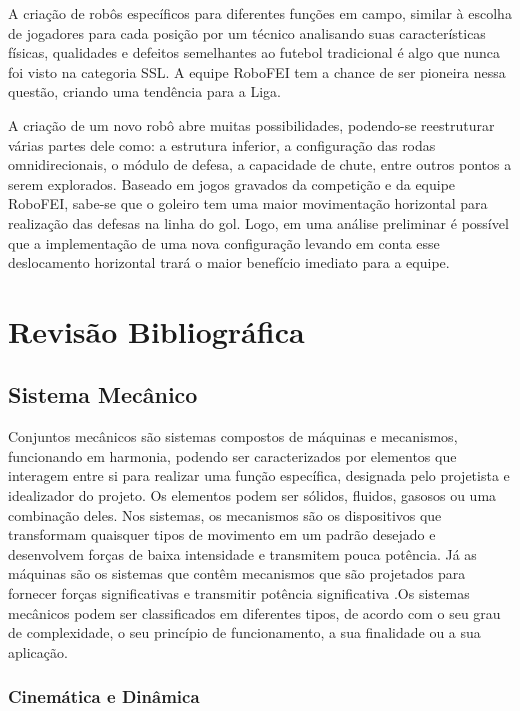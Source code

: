 \documentclass[deposito, acronym, symbols]{fei}
\begin{document}
A criação de robôs específicos para diferentes funções em campo, similar à escolha de jogadores para cada posição por um técnico analisando suas características físicas, qualidades e defeitos semelhantes ao futebol tradicional é algo que nunca foi visto na categoria SSL. A equipe RoboFEI tem a chance de ser pioneira nessa questão, criando uma tendência para a Liga.

A criação de um novo robô abre muitas possibilidades, podendo-se reestruturar várias partes dele como: a estrutura inferior, a configuração das rodas omnidirecionais, o módulo de defesa, a capacidade de chute, entre outros pontos a serem explorados. Baseado em jogos gravados da competição e da equipe RoboFEI, sabe-se que o goleiro tem uma maior movimentação horizontal para realização das defesas na linha do gol. Logo, em uma análise preliminar é possível que a implementação de uma nova configuração levando em conta esse deslocamento horizontal trará o maior benefício imediato para a equipe. 

\chapter{Revisão Bibliográfica}

\section{Sistema Mecânico}

Conjuntos mecânicos são sistemas compostos de máquinas e mecanismos, funcionando em harmonia, podendo ser caracterizados por elementos que interagem entre si para realizar uma função específica, designada pelo projetista e idealizador do projeto. Os elementos podem ser sólidos, fluidos, gasosos ou uma combinação deles. Nos sistemas, os mecanismos são os dispositivos que transformam quaisquer tipos de movimento em um padrão desejado e desenvolvem forças de baixa intensidade e transmitem pouca potência. Já as máquinas são os sistemas que contêm mecanismos que são projetados para fornecer forças significativas e transmitir potência significativa \cite{norton2010cinematica}.Os sistemas mecânicos podem ser classificados em diferentes tipos, de acordo com o seu grau de complexidade, o seu princípio de funcionamento, a sua finalidade ou a sua aplicação.

\subsection{Cinemática e Dinâmica}
\end{document}
